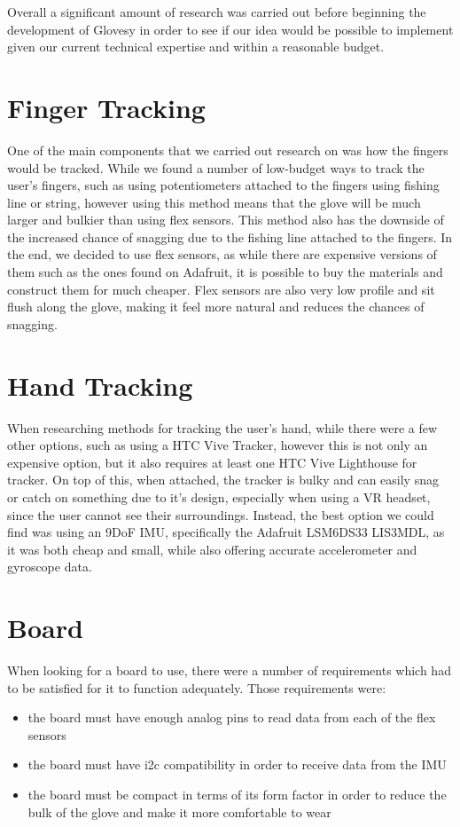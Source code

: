 \documentclass[12pt,a4paper,oneside]{book}
\theoremstyle{plain}
\numberwithin{equation}{chapter}
\newcounter{Secnum}
\begin{document}
\noindent Overall a significant amount of research was carried out before beginning the development of Glovesy in order to see if our idea would be possible to implement given our current technical expertise 
and within a reasonable budget.

\section{\textbf{Finger Tracking}}

\noindent One of the main components that we carried out research on was how the fingers would be tracked.
While we found a number of low-budget ways to track the user's fingers, such as using potentiometers attached to the fingers using fishing line or string, however using this method means that the glove will be much larger and bulkier than using flex sensors. This method also has the downside of the increased chance of snagging due to the fishing line attached to the fingers.
In the end, we decided to use flex sensors, as while there are expensive versions of them such as the ones found on Adafruit, it is possible to buy the materials and construct them for much cheaper. Flex sensors are also very low profile and sit flush along the glove, making it feel more natural and reduces the chances of snagging.

\section{\textbf{Hand Tracking}}

\noindent When researching methods for tracking the user's hand, while there were a few other options, such as using a HTC Vive Tracker, however this is not only an expensive option, but it also requires at least one HTC Vive Lighthouse for tracker. On top of this, when attached, the tracker is bulky and can easily snag or catch on something due to it's design, especially when using a VR headset, since the user cannot see their surroundings.  Instead, the best option we could find was using an 9DoF IMU, specifically the Adafruit LSM6DS33 LIS3MDL, as it was both cheap and small, while also offering accurate accelerometer and gyroscope data.

\section{\textbf{Board}}

\noindent When looking for a board to use, there were a number of requirements which had to be satisfied for it to function adequately. Those requirements were: 
\begin{itemize}
    \item{the board must have enough analog pins to read data from each of the flex sensors}
    \item{the board must have i2c compatibility in order to receive data from the IMU}
    \item{the board must be compact in terms of its form factor in order to reduce the bulk of the glove and make it more comfortable to wear}
\end{itemize}
\end{document}
